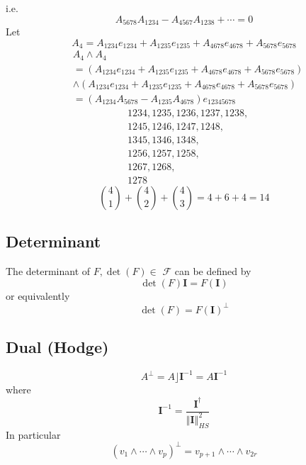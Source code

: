 \documentclass[aps,preprint]{revtex4}%
\begin{document}
i.e.
\begin{equation}
A_{5678}A_{1234}-A_{4567}A_{1238}+\cdots=0
\end{equation}
Let%
\[
A_{4}=A_{1234}e_{1234}+A_{1235}e_{1235}+A_{4678}e_{4678}+A_{5678}e_{5678}%
\]%
\begin{align}
&  A_{4}\wedge A_{4}\\
&  =\left(  A_{1234}e_{1234}+A_{1235}e_{1235}+A_{4678}e_{4678}+A_{5678}%
e_{5678}\right)  \\
&  \wedge\left(  A_{1234}e_{1234}+A_{1235}e_{1235}+A_{4678}e_{4678}%
+A_{5678}e_{5678}\right)  \\
&  =\left(  A_{1234}A_{5678}-A_{1235}A_{4678}\right)  e_{12345678}%
\end{align}%
\begin{align}
&  1234,1235,1236,1237,1238,\\
&  1245,1246,1247,1248,\\
&  1345,1346,1348,\\
&  1256,1257,1258,\\
&  1267,1268,\\
&  1278
\end{align}%
\begin{equation}
\binom{4}{1}+\binom{4}{2}+\binom{4}{3}=4+6+4=14
\end{equation}


\subsection{Determinant}

The determinant of $F,\det(F)\in$ $\mathcal{F}$ can be defined by
\begin{equation}
\det(F)\mathbf{I}=F\left(  \mathbf{I}\right)
\end{equation}
or equivalently
\begin{equation}
\det(F)=F\left(  \mathbf{I}\right)  ^{\bot}%
\end{equation}


\subsection{Dual (Hodge)}%

\begin{equation}
A^{\bot}=A\rfloor\mathbf{I}^{-1}=A\mathbf{I}^{-1}%
\end{equation}
where
\begin{equation}
\mathbf{I}^{-1}=\frac{\mathbf{I}^{\dagger}}{\left\Vert \mathbf{I}\right\Vert
_{HS}^{2}}%
\end{equation}
In particular
\begin{equation}
\left(  v_{1}\wedge\cdots\wedge v_{p}\right)  ^{\bot}=v_{p+1}\wedge
\cdots\wedge v_{2r}%
\end{equation}
\end{document}
